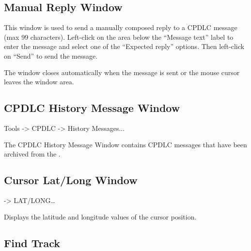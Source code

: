 \documentclass[a4paper,oneside,11pt]{memoir}
\begin{document}
\subsection{Manual Reply Window}
\label{win:dlmrw}

This window is used to send a manually composed reply to a CPDLC message (max 99 characters). Left-click on the area below the “Message text” label to enter the message and select one of the “Expected reply” options. Then left-click on “Send” to send the message.

\bigskip

The window closes automatically when the message is sent or the mouse cursor leaves the window area.


\subsection{CPDLC History Message Window}
\label{win:dlhmw}

 Tools -> CPDLC -> History Messages...

\bigskip


The CPDLC History Message Window contains CPDLC messages that have been archived from the .

\subsection{Cursor Lat/Long Window}\label{win:latlon}

 -> LAT/LONG…

\bigskip


Displays the latitude and longitude values of the cursor position.

\subsection{Find Track}\label{func:findt}
\end{document}

